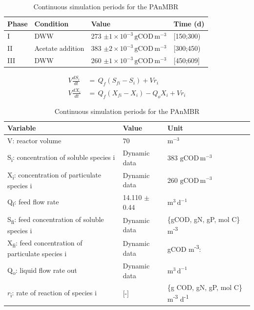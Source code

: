 \begin{table}[H]
    \centering
    \small
    \renewcommand{\arraystretch}{1.4}
    \caption{Continuous simulation periods for the PAnMBR}
    \tabcolsep=0.11cm
    \begin{tabular}{@{}p{2cm} p{4cm} p{5cm} p{2cm}@{}} \toprule
        Phase & Condition & Value & Time (d) \\ 
        \hline
        I & DWW & 273 $\mathrm{\pm 1 \times 10^{-3}\, gCOD\, m^{-3}}$ & [150;300)\\
        II & Acetate addition & 383 $\mathrm{\pm 2 \times 10^{-3}\, gCOD\, m^{-3}}$ & [300;450)\\
        III & DWW & 260 $\mathrm{\pm 1 \times 10^{-3}\, gCOD\, m^{-3}}$ & [450;609]\\
        \bottomrule
    \end{tabular}
    \label{tab:cont}
\end{table}

\begin{align}
    V \frac{dS_i}{dt} \, &= \, Q_f (S_{fi} - S_i) + V {r}_i  \nonumber \\
    V \frac{dX_i}{dt}\, &= \, Q_f (X_{fi} - X_i) - Q_o X_i + V {r}_i
    \label{eq:cont}
\end{align}

\begin{table}[H]
    \centering
    \small
    \renewcommand{\arraystretch}{1.4}
    \caption{Continuous simulation periods for the PAnMBR}
    \tabcolsep=0.11cm
    \begin{tabular}{@{}p{7cm} p{4cm} p{5cm}@{}} \toprule
        Variable  & Value & Unit \\ 
        \hline
        V: reactor volume & $\mathrm{70}$ & $ \mathrm{m^{-3}}$ \\
        S\textsubscript{i}: concentration of soluble species i & Dynamic data & 383 $\mathrm{gCOD\, m^{-3}}$ \\
        X\textsubscript{i}: concentration of particulate species i & Dynamic data & 260 $\mathrm{gCOD\, m^{-3}}$ \\
        Q\textsubscript{f}: feed flow rate  & 14.110 $\pm$ 0.44 & $\mathrm{m^3\, d^{-1}}$\\
        S\textsubscript{fi}: feed concentration of soluble species i & Dynamic data & \{gCOD, gN, gP, mol C\} m\textsuperscript{-3}\\
        X\textsubscript{fi}: feed concentration of particulate species i & Dynamic data & gCOD m\textsuperscript{-3}: \\
        Q\textsubscript{o}: liquid flow rate out & Dynamic data&  $\mathrm{m^3\, d^{-1}}$\\
        ${r}$\textsubscript{i}: rate of reaction of species i & [-] & \{g COD, gN, gP, mol C\} m\textsuperscript{-3} d\textsuperscript{-1} \\
        \bottomrule
    \end{tabular}
    \label{tab:cont_op_conditions}
\end{table}




